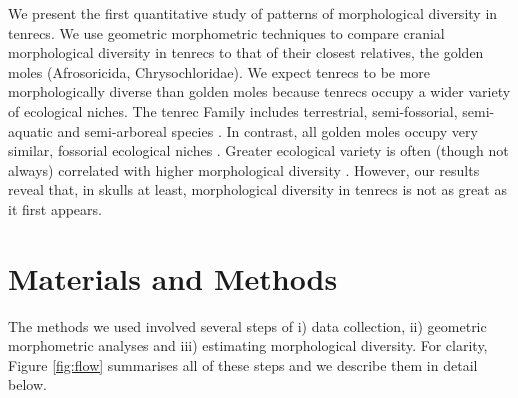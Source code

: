 \documentclass[12pt,a4paper]{article}
\begin{document}
	
	We present the first quantitative study of patterns of morphological diversity in tenrecs. We use geometric morphometric techniques \citep{Rohlf1993} to compare cranial morphological diversity in tenrecs to that of their closest relatives, the golden moles (Afrosoricida, Chrysochloridae). 
	We expect tenrecs to be more morphologically diverse than golden moles because tenrecs occupy a wider variety of ecological niches. The tenrec Family includes terrestrial, semi-fossorial, semi-aquatic and semi-arboreal species \citep{Soarimalala2011}. In contrast, all golden moles occupy very similar, fossorial ecological niches \citep{Bronner1995}. Greater ecological variety is often (though not always) correlated with higher morphological diversity \citep{Losos2010a}. 
	However, our results reveal that, in skulls at least, morphological diversity in tenrecs is not as great as it first appears.
	
\section{Materials and Methods}

	The methods we used involved several steps of i) data collection, ii) geometric morphometric analyses and iii) estimating morphological diversity. For clarity,  Figure \ref{fig:flow} summarises all of these steps and we describe them in detail below.  	
	
\end{document}
